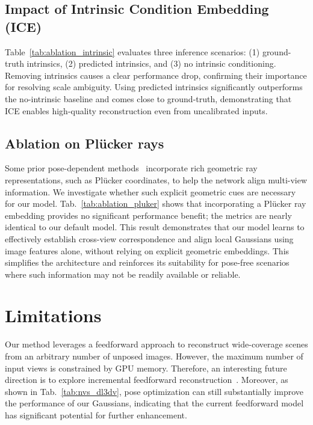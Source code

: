 \subsection{Impact of Intrinsic Condition Embedding (ICE)}

Table~\ref{tab:ablation_intrinsic} evaluates three inference scenarios: (1) ground-truth intrinsics, (2) predicted intrinsics, and (3) no intrinsic conditioning. Removing intrinsics causes a clear performance drop, confirming their importance for resolving scale ambiguity. Using predicted intrinsics significantly outperforms the no-intrinsic baseline and comes close to ground-truth, demonstrating that ICE enables high-quality reconstruction even from uncalibrated inputs.



\subsection{Ablation on Plücker rays}

Some prior pose-dependent methods~\citep{llrm, gslrm} incorporate rich geometric ray representations, such as Plücker coordinates, to help the network align multi-view information. We investigate whether such explicit geometric cues are necessary for our model. Tab.~\ref{tab:ablation_pluker} shows that incorporating a Plücker ray embedding provides no significant performance benefit; the metrics are nearly identical to our default model. This result demonstrates that our model learns to effectively establish cross-view correspondence and align local Gaussians using image features alone, without relying on explicit geometric embeddings. This simplifies the architecture and reinforces its suitability for pose-free scenarios where such information may not be readily available or reliable.

\section{Limitations}
Our method leverages a feedforward approach to reconstruct wide-coverage scenes from an arbitrary number of unposed images. However, the maximum number of input views is constrained by GPU memory. Therefore, an interesting future direction is to explore incremental feedforward reconstruction~\citep{cut3r}. Moreover, as shown in Tab.~\ref{tab:nvs_dl3dv}, pose optimization can still substantially improve the performance of our Gaussians, indicating that the current feedforward model has significant potential for further enhancement.

